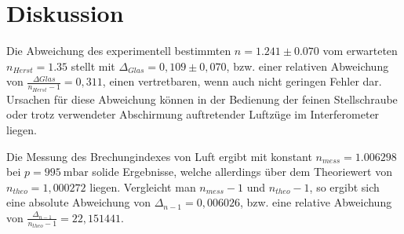 \section{Diskussion}
Die Abweichung des experimentell bestimmten $n =1.241 \pm 0.070$ vom erwarteten $n_{Herst} = 1.35$ stellt mit $\Delta_{Glas} = 0,109 \pm 0,070$, bzw. einer relativen Abweichung von $\frac{\Delta{Glas}}{n_{Herst}-1} = 0,311$, einen vertretbaren, wenn auch nicht geringen Fehler dar. Ursachen für diese Abweichung können in der Bedienung der feinen Stellschraube oder trotz verwendeter Abschirmung auftretender Luftzüge im Interferometer liegen.

Die Messung des Brechungindexes von Luft ergibt mit konstant $n_{mess}=1.006298$ bei $p=\SI{995}{\milli\bar}$ solide Ergebnisse, welche allerdings über dem Theoriewert von $n_{theo}=1,000272$ \cite{Luftdruck} liegen. Vergleicht man $n_{mess}-1$ und $n_{theo}-1$, so ergibt sich eine absolute Abweichung von $\Delta_{n-1} = 0,006026$, bzw. eine relative Abweichung von $\frac{\Delta_{n-1}}{n_{theo}-1}=22,151441$. 
